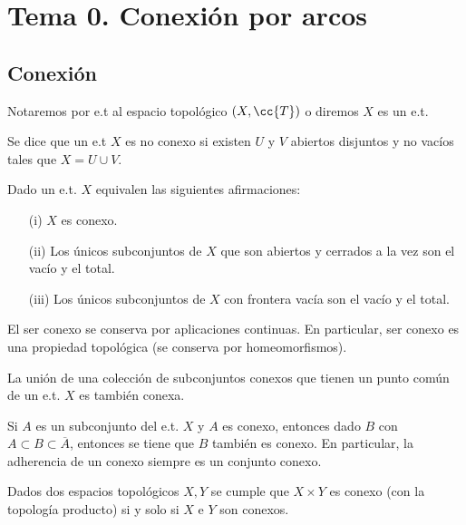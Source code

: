 \chapter*{Tema 0. Conexión por arcos}

\section{Conexión}

\begin{notacion}
    Notaremos por e.t al espacio topológico $(X,\cc{T})$ o diremos $X$ es un e.t.
\end{notacion}

\begin{definicion}
    Se dice que un e.t $X$ es {no} conexo si existen $U$ y $V$ abiertos disjuntos y no vacíos tales que $X=U\cup V$. 
\end{definicion}

\begin{prop}
    Dado un e.t. $X$ equivalen las siguientes afirmaciones:
    \begin{enumerate}
        \item[(i)] $X$ es conexo.
        \item[(ii)] Los únicos subconjuntos de $X$ que son abiertos y cerrados a la vez son el vacío y el total. 
        \item[(iii)] Los únicos subconjuntos de $X$ con frontera vacía son el vacío y el total. 
    \end{enumerate}
\end{prop}

\begin{teo}
    El ser conexo se conserva por aplicaciones continuas. En particular, ser conexo es una propiedad topológica (se conserva por homeomorfismos).
\end{teo}

\begin{teo}
    La unión de una colección de subconjuntos conexos que tienen un punto común de un e.t. $X$ es también conexa.
\end{teo}

\begin{teo}
    Si $A$ es un subconjunto del e.t. $X$ y $A$ es conexo, entonces dado $B$ con $A\subset B\subset\overline{A}$, entonces se tiene que $B$ también es conexo. En particular, la adherencia de un conexo siempre es un conjunto conexo.
\end{teo}

\begin{teo}
    Dados dos espacios topológicos $X,Y$ se cumple que $X\times Y$ es conexo (con la topología producto) si y solo si $X$ e $Y$ son conexos.
\end{teo}

